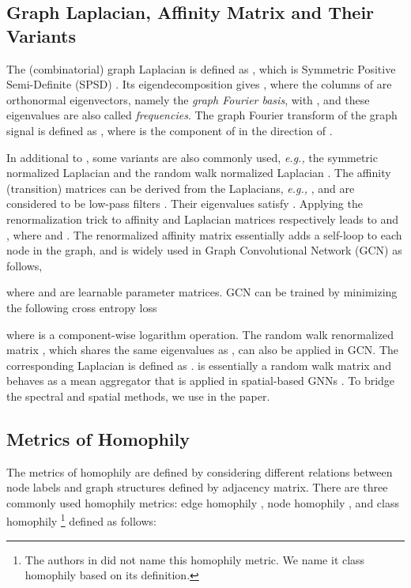 \documentclass{article}
\newcommand\eg{\textit{e.g.,}}
\newcommand{\0}{{\boldsymbol{0}}}
\newcommand{\6}{{\partial}}
\newcommand{\8}{{\infty}}
\newcommand{\4}{{\nabla}}
\begin{document}
\subsection{Graph Laplacian, Affinity Matrix and Their Variants} 
\label{sec:laplacian_affinity_matrix}
The (combinatorial) graph Laplacian is defined as , which is Symmetric Positive Semi-Definite (SPSD)  \cite{chung1997spectral}. Its eigendecomposition gives , where the columns  of  are orthonormal eigenvectors, namely the \textit{graph Fourier basis},  with , and these eigenvalues are also called \textit{frequencies}. The graph Fourier transform of the graph signal  is defined as , where  is the component of  in the direction of . 

In additional to , some variants are also commonly used, \eg{} the symmetric normalized Laplacian  and the random walk normalized Laplacian . The affinity (transition) matrices can be derived from the Laplacians, \eg{} ,  and are considered to be low-pass filters \cite{maehara2019revisiting}.
Their eigenvalues satisfy . 
Applying the renormalization trick \cite{kipf2016classification} to affinity and Laplacian matrices respectively leads to  and , 
where  and . The renormalized affinity matrix essentially adds a self-loop to each node in the graph, and is widely used in Graph Convolutional Network (GCN) \cite{kipf2016classification} as follows,

where  and  are learnable parameter matrices. GCN can be trained by minimizing the following cross entropy loss

where  is a component-wise logarithm operation. The random walk renormalized matrix ,
which shares the same eigenvalues as , can also be applied in GCN. The corresponding Laplacian is defined as . 
 is essentially a random walk matrix and
behaves as a mean aggregator that is applied in spatial-based GNNs \cite{hamilton2017inductive,hamilton2020graph}. To bridge the spectral and spatial methods, we use  in the paper.

\subsection{Metrics of Homophily}
\label{sec:homophily_metrics}
The metrics of homophily are defined by considering different relations between node labels and graph structures defined by adjacency matrix. There are three commonly used homophily metrics: edge homophily \cite{abu2019mixhop,zhu2020beyond}, node homophily \cite{pei2020geom}, and class homophily \cite{lim2021new} \footnote{The authors in \cite{lim2021new} did not name this homophily metric. We name it class homophily based on its definition.} defined as follows:
\end{document}

